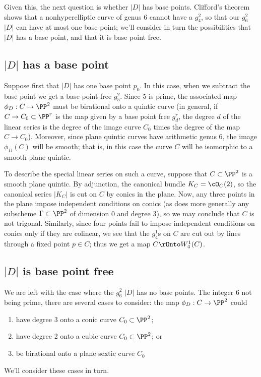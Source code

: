 Given this, the next question is whether $|D|$ has base points.  Clifford's theorem shows that a nonhyperelliptic curve of genus 6 cannot have a $g^2_4$, so that our $g^2_6$ $|D|$ can have at most one base point; we'll consider in turn the possibilities that $|D|$ has a base point, and that it is base point free.

\subsection{$|D|$ has a base point}

Suppose first that $|D|$ has one base point $p_0$. In this case, when we subtract the base point we get a base-point-free $g^2_5$. Since 5 is prime, the associated map $\phi_D : C \to \PP^2$ must be birational onto a quintic curve (in general, if $C \to C_0 \subset \PP^r$ is the map given by a base point free $g^r_d$, the degree $d$ of the linear series is the degree of the image curve $C_0$ times the degree of the map $C \to C_0$). Moreover, since plane quintic curves have arithmetic genus 6, the image $\phi_D(C)$ will be smooth; that is, in this case the curve $C$ will be isomorphic to a smooth plane quintic.

To describe the special linear series on such a curve, suppose that $C \subset \PP^2$ is a smooth plane quintic. By adjunction, the canonical bundle $K_C = \cO_C(2)$, so the canonical series $|K_C|$ is cut on $C$ by conics in the plane. Now, any three points in the plane impose independent conditions on conics (as does more generally any subscheme $\Gamma \subset \PP^2$ of dimension 0 and degree 3), so we may conclude that $C$ is not trigonal. Similarly, since four points fail to impose independent conditions on conics only if they are colinear, we see that the $g^1_4$s on $C$ are cut out by lines through a fixed point $p \in C$; thus we get a map $C\rOnto W^1_4(C)$.

\subsection{$|D|$ is base point free}

We are left with the case where the $g^2_6$ $|D|$ has no base points. The integer 6 not being prime, there are several cases to consider: the map $\phi_D : C \to \PP^2$ could
\begin{enumerate}
\item have degree 3 onto a conic curve $C_0 \subset \PP^2$;
\item have degree 2 onto a cubic curve $C_0 \subset \PP^2$; or
\item be birational onto a plane sextic curve $C_0$
\end{enumerate}
We'll consider these cases in turn.

